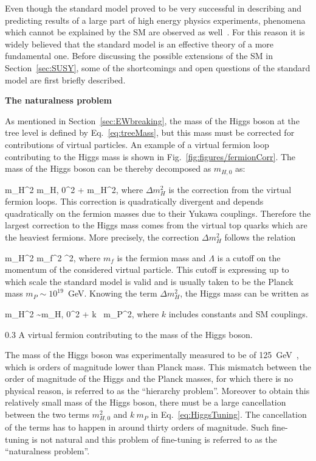 Even though the standard model proved to be very successful in describing and predicting results of a large part of high energy physics experiments, phenomena which cannot be explained by the SM are observed as well~\cite{9783527406012}. For this reason it is widely believed that the standard model is an effective theory  of a more fundamental one. Before discussing the possible extensions of the SM in Section~\ref{sec:SUSY}, some of the shortcomings and open questions of the standard model are first briefly described.


\textbf{The naturalness problem}

As mentioned in Section~\ref{sec:EWbreaking}, the mass of the Higgs boson at the tree level is defined by Eq.~\ref{eq:treeMass}, but this mass must be corrected for contributions of virtual particles. An example of a virtual fermion loop contributing to the Higgs mass is shown in Fig.~\ref{fig:figures/fermionCorr}. The mass of the Higgs boson can be thereby decomposed as $m_{H,0}$ as:

{
m_{H}^{2} \approx m_{H, 0}^{2} + \Delta m_{H}^{2},
}
where $\Delta m_{H}^{2}$ is the correction from the virtual fermion loops. This correction is quadratically divergent and depends quadratically on the fermion masses due to their Yukawa couplings. Therefore the largest correction to the Higgs mass comes from the virtual top quarks which are the heaviest fermions. More precisely, the correction $\Delta m_{H}^{2}$ follows the relation

{
\Delta m_{H}^{2} \propto m_{f}^{2} \Lambda^2,
}
where $m_f$ is the fermion mass and $\Lambda$ is a cutoff on the momentum of the considered virtual particle. This cutoff is expressing up to which scale the standard model is valid and is usually taken to be the Planck mass $m_{P} \sim  10^{19}$~GeV. Knowing the term $\Delta m_{H}^{2}$, the Higgs mass can be written as

{
m_{H}^{2} \sim m_{H, 0}^{2} + k ~m_{P}^{2},
}
where $k$ includes constants and SM couplings. 

                 {0.3}       %
                 { A virtual fermion contributing to the mass of the Higgs boson. }

The mass of the Higgs boson was experimentally measured to be of 125~GeV~\cite{Chatrchyan:2012xdj, Aad:2012tfa}, which is orders of magnitude lower than Planck mass. This mismatch between the order of magnitude of the Higgs and the Planck masses, for which there is no physical reason, is referred to as the ``hierarchy problem''. Moreover to obtain this relatively small mass of the Higgs boson, there must be a large cancellation between the two terms $m_{H, 0}^{2}$ and $k ~m_{P}$  in Eq.~\ref{eq:HiggsTuning}. The cancellation of the terms has to happen in around thirty orders of magnitude. Such fine-tuning is not natural and this problem of fine-tuning is referred to as the ``naturalness problem''.

